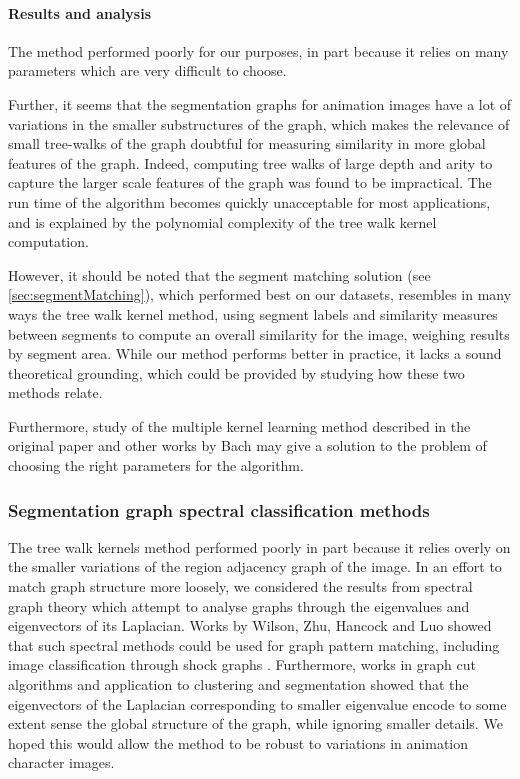 \paragraph{Results and analysis} The method performed poorly for our purposes, in part because it relies on many parameters which are very difficult to choose.

Further, it seems that the segmentation graphs for animation images have a lot of variations in the smaller substructures of the graph, which makes the relevance of small tree-walks of the graph doubtful for measuring similarity in more global features of the graph. Indeed, computing tree walks of large depth and arity to capture the larger scale features of the graph was found to be impractical. The run time of the algorithm becomes quickly unacceptable for most applications, and is explained by the polynomial complexity of the tree walk kernel computation.

However, it should be noted that the segment matching solution (see \autoref{sec:segmentMatching}), which performed best on our datasets, resembles in many ways the tree walk kernel method, using segment labels and similarity measures between segments to compute an overall similarity for the image, weighing results by segment area. While our method performs better in practice, it lacks a sound theoretical grounding, which could be provided by studying how these two methods relate.

Furthermore, study of the multiple kernel learning method described in the original paper and other works by Bach \cite{bach2004multiple} may give a solution to the problem of choosing the right parameters for the algorithm.

\subsubsection{Segmentation graph spectral classification methods}
The tree walk kernels method performed poorly in part because it relies overly on the smaller variations of the region adjacency graph of the image. In an effort to match graph structure more loosely, we considered the results from spectral graph theory which attempt to analyse graphs through the eigenvalues and eigenvectors of its Laplacian. Works by Wilson, Zhu, Hancock and Luo showed that such spectral methods could be used for graph pattern matching, including image classification through shock graphs \cite{wilson2005pattern}\cite{wilson2008study}. Furthermore, works in graph cut algorithms and application to clustering \cite{ng2002spectral} and segmentation\cite{shi2000normalized}\cite{meila2001random} showed that the eigenvectors of the Laplacian corresponding to smaller eigenvalue encode to some extent sense the global structure of the graph, while ignoring smaller details. We hoped this would allow the method to be robust to variations in animation character images.

